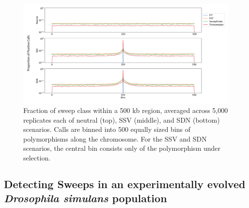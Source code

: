 \begin{figure}
    \centering
    \includegraphics[width=\textwidth]{figures/ch1/Figure_5.pdf}
    \caption[Timesweeper localization performance]{Fraction of sweep class within a 500 kb region, averaged across 5,000 replicates each of neutral (top), SSV (middle), and SDN (bottom) scenarios. Calls are binned into 500 equally sized bins of polymorphisms along the chromosome. For the SSV and SDN scenarios, the central bin consists only of the polymorphism under selection.}
    \label{fig:TS-F5}
\end{figure}



\subsection{Detecting Sweeps in an experimentally evolved \textit{Drosophila simulans} population}

